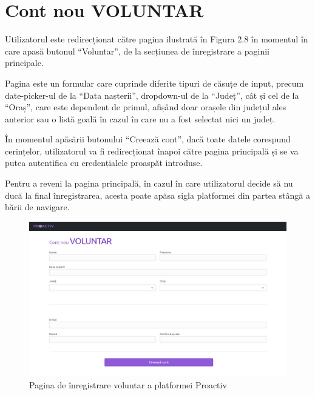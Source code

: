 \documentclass[12pt,a4paper]{report}
\begin{document}
\section{Cont nou VOLUNTAR}
\par
Utilizatorul este redirecționat către pagina ilustrată în Figura 2.8 în momentul în care apasă butonul “Voluntar”, de la secțiunea de înregistrare a paginii principale.
\\\par
Pagina este un formular care cuprinde diferite tipuri de căsuțe de input, precum date-picker-ul de la “Data nașterii”, dropdown-ul de la “Județ”, cât și cel de la “Oraș”, care este dependent de primul, afișând doar orașele din județul ales anterior sau o listă goală în cazul în care nu a fost selectat nici un județ.
\\\par
În momentul apăsării butonului “Creează cont”, dacă toate datele corespund cerințelor, utilizatorul va fi redirecționat înapoi către pagina principală și se va putea autentifica cu credențialele proaspăt introduse.
\\\par
Pentru a reveni la pagina principală, în cazul în care utilizatorul decide să nu ducă la final înregistrarea, acesta poate apăsa sigla platformei din partea stângă a bării de navigare.
\\
\begin{figure}[H]
\centering
  \includegraphics[width=1\linewidth]{./imagini/contvol.jpg}
  \caption{Pagina de înregistrare voluntar a platformei Proactiv}
\end{figure}
\end{document}
